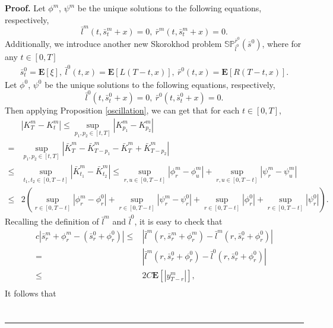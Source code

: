 \documentclass[10pt]{article}%
\numberwithin{equation}{section}
\newenvironment{proof}[1][Proof]{\noindent \textbf{#1.} }{\  \rule{0.5em}{0.5em}}
\begin{document}
\begin{proof}
Let  $\phi^m$, $\psi^m$ be the unique solutions to the following equations, respectively, $$\bar{l}^m\left(t,\bar{s}_t^m+x\right)=0,\ \bar{r}^m\left(t,\bar{s}_t^m+x\right)=0.$$
Additionally, we introduce another new  Skorokhod problem $\mathbb{SP}_{\bar{l}^0}^{\bar{r}^0}(\bar{s}^{0})$, where for any $t\in[0,T]$
   $$
  \begin{aligned}
   \bar{s}_{t}^{0}=\mathbf{E}\left[\xi\right],\ \bar{l}^{0}(t,x)=\mathbf{E}\left[L(T-t,x)\right],\ \bar{r}^{0}(t,x)=\mathbf{E}\left[R(T-t,x)\right].
  \end{aligned}
  $$
 Let $\phi^{0}$, $\psi^{0}$ be the unique solutions to the following equations, respectively, $$\bar{l}^0\left(t,\bar{s}_t^{0}+x\right)=0,\ \bar{r}^0\left(t,\bar{s}_t^{0}+x\right)=0.$$ 
 Then applying Proposition \ref{oscillation}, we can get that for each $t\in[0,T]$,
  \begin{equation}\begin{split}\label{3-0}
   &\left|K_{T}^{m}-K_{t}^{m}\right|\leq\sup_{p_1,p_2\in[t,T]}\left|K_{p_1}^{m}-K_{p_2}^{m}\right|\\
   =&\sup_{p_1,p_2\in[t,T]}\left|\bar{K}_{T}^{m}-\bar{K}_{T-p_1}^{m}-\bar{K}_{T}^{m}+\bar{K}_{T-p_2}^{m}\right|\\ 
  \leq &\sup_{t_1,t_2\in[0,T-t]}\left|\bar{K}_{t_1}^{m}-\bar{K}_{t_2}^{m}\right|\leq \sup_{r,u\in[0,T-t]}\left|\phi_r^m-\phi_u^m\right|+\sup_{r,u\in[0,T-t]}\left|\psi_r^m-\psi_u^m\right|\\ 
  \leq&2\left(\sup_{r\in[0,T-t]}\left|\phi_r^m-\phi_r^{0}\right|+\sup_{r\in[0,T-t]}\left|\psi_r^m-\psi_r^{0}\right|+\sup_{r\in[0,T-t]}\left|\phi_r^{0}\right|+\sup_{r\in[0,T-t]}\left|\psi_r^{0}\right|\right).
  \end{split}   
  \end{equation}
Recalling the definition of $\bar{l}^m$ and $\bar{l}^0$, it is easy to check that 
   $$
  \begin{aligned}
  c\left|\bar{s}_{r}^m+\phi_r^m-(\bar{s}_{r}^{0}+\phi_r^0)\right|
  \leq&\left|\bar{l}^{m}(r,\bar{s}_{r}^m+\phi_r^m)-\bar{l}^{m}(r,\bar{s}_{r}^{0}+\phi_r^0)\right|\\
  = &\left|\bar{l}^{m}(r,\bar{s}_{r}^{0}+\phi_r^0)-\bar{l}^{0}(r,\bar{s}_{r}^{0}+\phi_r^0)\right| \\
  \leq& 2C\mathbf{E}\left[\left|y^{m}_{T-r}\right|\right],\\
  \end{aligned} 
   $$
It follows that
  \begin{equation}\begin{split}\label{3-1}

\end{split}
\end{equation}
\end{proof}
\end{document}
